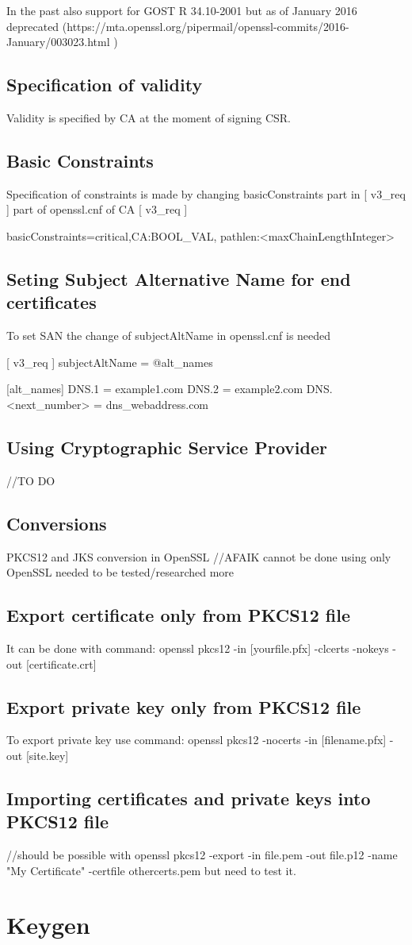 \documentclass{report}
\begin{document}
In the past also support for GOST R 34.10-2001 but as of January 2016 deprecated (https://mta.openssl.org/pipermail/openssl-commits/2016-January/003023.html )

\subsection{Specification of validity}
Validity is specified by CA at the moment of signing CSR.

\subsection{Basic Constraints}
Specification of constraints is made by changing basicConstraints part in [ v3_req ] part of openssl.cnf of CA
[ v3_req ]

basicConstraints=critical,CA:BOOL_VAL, pathlen:<maxChainLengthInteger>

\subsection{Seting Subject Alternative Name for end certificates}
To set SAN the change of subjectAltName in openssl.cnf is needed

[ v3_req ]
subjectAltName = @alt_names

[alt_names]
DNS.1 = example1.com
DNS.2 = example2.com
DNS.<next_number> = dns_webaddress.com

\subsection{Using Cryptographic Service Provider}
//TO DO

\subsection{Conversions}
PKCS12 and JKS conversion in OpenSSL
//AFAIK cannot be done using only OpenSSL needed to be tested/researched more

\subsection{Export certificate only from PKCS12 file}
It can be done with command:
openssl pkcs12 -in [yourfile.pfx] -clcerts -nokeys -out [certificate.crt] 

\subsection{Export private key only from PKCS12 file}
To export private key use command:
openssl pkcs12 -nocerts -in [filename.pfx] -out [site.key]

\subsection{Importing certificates and private keys into PKCS12 file}
//should be possible with openssl pkcs12 -export -in file.pem -out file.p12 -name "My Certificate" -certfile othercerts.pem but need to test it.




\section{Keygen}
\end{document}
